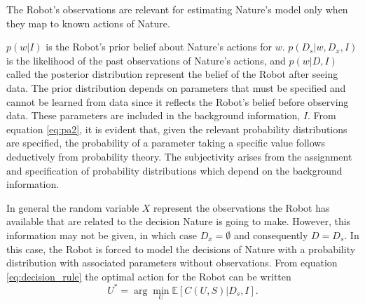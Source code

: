 \begin{axiom}
	\label{ax:observation_relevance}
	The Robot's observations are relevant for estimating Nature's model only when they map to known actions of Nature.
\end{axiom}

$p(w|I)$ is the Robot's prior belief about Nature's actions for $w$. $p(D_s|w,D_x,I)$ is the likelihood of the past observations of Nature's actions, and $p(w|D,I)$ called the posterior distribution represent the belief of the Robot after seeing data. The prior distribution depends on parameters that must be specified and cannot be learned from data since it reflects the Robot's belief before observing data. These parameters are included in the background information, $I$. From equation \eqref{eq:pa2}, it is evident that, given the relevant probability distributions are specified, the probability of a parameter taking a specific value follows deductively from probability theory. The subjectivity arises from the assignment and specification of probability distributions which depend on the background information.

\begin{example}
	In general the random variable $X$ represent the observations the Robot has available that are related to the decision Nature is going to make. However, this information may not be given, in which case $D_x=\emptyset$ and consequently $D = D_s$. In this case, the Robot is forced to model the decisions of Nature with a probability distribution with associated parameters without observations. From equation \eqref{eq:decision_rule} the optimal action for the Robot can be written
	\begin{equation}
		U^*=\arg\min_U\mathbb{E}[C(U, S)|D_s,I].
		\label{eq:best_decision1}
	\end{equation}
\end{example}